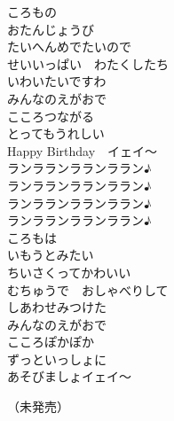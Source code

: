 {\kasho\quad
%
%
%
%

ころもの\\
おたんじょうび\\
たいへんめでたいので\\

せいいっぱい　わたくしたち\\
いわいたいですわ\\

みんなのえがおで\\
こころつながる\\
とってもうれしい\\
Happy Birthday　イェイ～\\

ランラランラランララン♪\\
ランラランラランララン♪\\
ランラランラランララン♪\\
ランラランラランララン♪\\

ころもは\\
いもうとみたい\\
ちいさくってかわいい\\

むちゅうで　おしゃべりして\\
しあわせみつけた\\

みんなのえがおで\\
こころぽかぽか\\
ずっといっしょに\\
あそびましょイェイ～

\vfill\mincho
（未発売）
}

